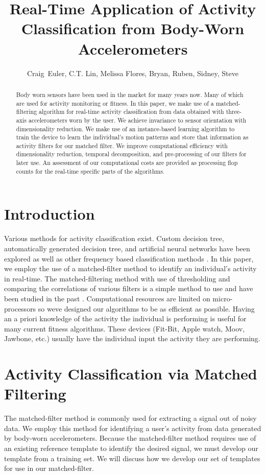 \documentclass[journal]{IEEEtran}
\begin{document}
%
\title{Real-Time Application of Activity Classification from Body-Worn Accelerometers}
%
\author{Craig~Euler, C.T. Lin, Melissa Flores, Bryan, Ruben, Sidney, Steve}
%
\maketitle
%
\begin{abstract}
Body worn sensors have been used in the market for many years now.
Many of which are used for activity monitoring or fitness.
In this paper, we make use of a matched-filtering algorithm for real-time activity classification from data obtained with three-axis accelerometers worn by the user.
We achieve invariance to sensor orientation with dimensionality reduction.
We make use of an instance-based learning algorithm to train the device to learn the individual's motion patterns and store that information as activity filters for our matched filter.
We improve computational efficiency with dimensionality reduction, temporal decomposition, and pre-processing of our filters for later use.
An assessment of our computational costs are provided as processing flop counts for the real-time specific parts of the algorithms.
\end{abstract}
%
\section{Introduction}
Various methods for activity classification exist.
Custom decision tree, automatically generated decision tree, and artificial neural networks \cite{parkka_ermes_korpipaa_mantyjarvi_peltola_korhonen_2006} have been explored as well as other frequency based classification methods \cite{sharma_purwar_lee_lee_chung_2008}.
In this paper, we employ the use of a matched-filter method to identify an individual’s activity in real-time.
The matched-filtering method with use of thresholding and comparing the correlations of various filters is a simple method to use and have been studied in the past \cite{giannakis_tsatsanis_1990}.
Computational resources are limited on micro-processors so we\textquotesingle ve designed our algorithms to be as efficient as possible.
Having an a priori knowledge of the activity the individual is performing is useful for many current fitness algorithms.
These devices (Fit-Bit, Apple watch, Moov, Jawbone, etc.) usually have the individual input the activity they are performing.
%
\section{Activity Classification via Matched Filtering}
The matched-filter method is commonly used for extracting a signal out of noisy data.
We employ this method for identifying a user’s activity from data generated by body-worn accelerometers.
Because the matched-filter method requires use of an existing reference template to identify the desired signal, we must develop our template from a training set.
We will discuss how we develop our set of templates for use in our matched-filter.
\end{document}
